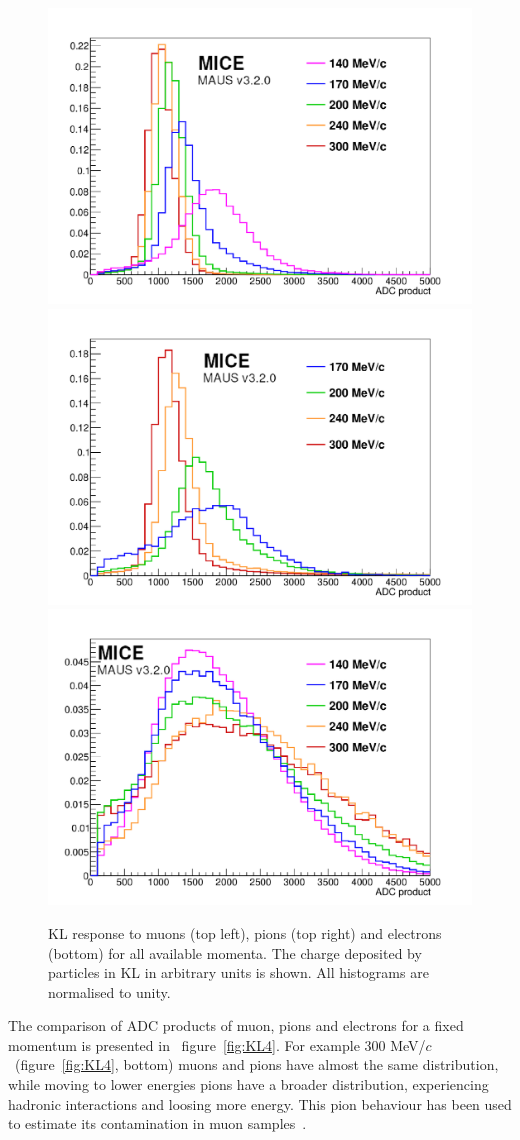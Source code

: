  \begin{figure}[htb!]
	\begin{center}
  		\includegraphics[width=0.49\columnwidth]{./04-KL/Figures/muon.pdf}
  		\includegraphics[width=0.49\columnwidth]{./04-KL/Figures/pion.pdf}
  		\includegraphics[width=0.49\columnwidth]{./04-KL/Figures/electron.pdf}
  		\caption{KL response to muons (top left), pions (top right) and electrons (bottom) for all available momenta. The charge deposited by particles in KL in arbitrary units is shown. All histograms are normalised to unity.}
  		\label{fig:KL3}
  	\end{center}
  \end{figure}
  
The comparison of ADC products of muon, pions and electrons for a fixed momentum is presented in ~figure~\ref{fig:KL4}. 
For example 300 MeV/$c$~(figure~\ref{fig:KL4}, bottom) muons and pions have almost the same distribution, while moving to lower energies pions have a broader distribution, experiencing hadronic interactions and loosing more energy.
This pion behaviour has been used to estimate its contamination in muon samples~\cite{2016JInst..11P3001A}. 

